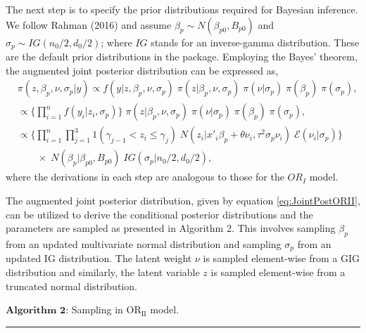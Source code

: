 The next step is to specify the prior distributions required for Bayesian inference. We follow Rahman (2016) and assume \(\beta_{p} \sim N(\beta_{p0}, B_{p0})\) and \(\sigma_{p} \sim IG(n_{0}/2, d_{0}/2)\); where \(IG\) stands for an inverse-gamma distribution. These are the default prior distributions in the  package. Employing the Bayes' theorem, the augmented joint posterior distribution can be expressed as,
\begin{equation} 
\begin{split} 
& \pi(z,\beta_{p}, \nu, \sigma_{p} | y)
    \propto f(y|z, \beta_{p}, \nu, \sigma_{p} ) \; \pi(z|\beta_{p}, \nu, \sigma_{p} ) \; \pi(\nu|\sigma_{p}) \; \pi(\beta_{p}) \; \pi(\sigma_{p}),  \\
    & \propto \Big\{ \prod_{i=1}^{n} f(y_{i}|z_{i}, \sigma_{p})  \Big\} \; \pi(z|\beta_{p}, \nu, \sigma_{p} ) \; \pi(\nu|\sigma_{p}) \; \pi(\beta_{p}) \; \pi(\sigma_{p}), \\
    &  \propto \bigg\{ \prod_{i=1}^{n} \prod_{j=1}^{3} 1(\gamma_{j-1} < z_{i} \le \gamma_{j}) \; N(z_{i}|x'_{i}\beta_{p} + \theta \nu_{i}, \tau^{2} \sigma_{p} \nu_{i}) \; \mathcal{E}(\nu_{i}|\sigma_{p}) \bigg\} \\
    &   \qquad \times \; N(\beta_{p}|\beta_{p0}, B_{p0}) \; IG(\sigma_{p}|n_{0}/2, d_{0}/2),
\end{split} 
\label{eq:JointPostORII} 
\end{equation}
where the derivations in each step are analogous to those for the \(OR_{I}\) model.

The augmented joint posterior distribution, given by equation \eqref{eq:JointPostORII}, can be utilized to derive the conditional posterior distributions and the parameters are sampled as presented in Algorithm 2. This involves sampling \(\beta_{p}\) from an updated multivariate normal distribution and sampling \(\sigma_{p}\) from an updated IG distribution. The latent weight \(\nu\) is sampled element-wise from a GIG distribution and similarly, the latent variable \(z\) is sampled element-wise from a truncated normal distribution.

\vspace{6pt}

\(\textbf{Algorithm~2}\): Sampling in \(\mathrm{OR_{II}}\) model.

\noindent

\rule{\textwidth}{0.5pt}

